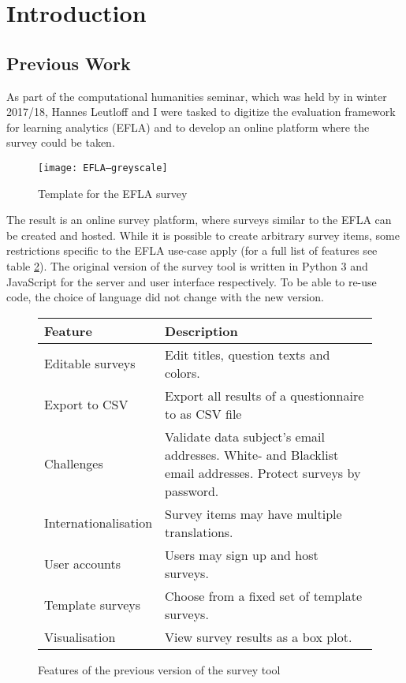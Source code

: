 \section{Introduction}


\subsection{Previous Work}
    As part of the computational humanities seminar, which was held by \profhd in winter 2017/18, Hannes Leutloff
    and I were tasked to digitize the evaluation framework for learning analytics (EFLA) \cite{efla} and to
    develop an online platform where the survey could be taken.

    \begin{figure}
        \centering
        \texttt{[image: EFLA--greyscale]}
        \caption{Template for the EFLA survey \cite{efla-website}}
        \label{fig:efla-template}
    \end{figure}

   The result is an online survey platform, where surveys similar to the EFLA can be created
   and hosted. While it is possible to create arbitrary survey items, some restrictions
   specific to the EFLA use-case apply (for a full list of features see table \ref{table:v1-features}).
   The original version of the survey tool is written in Python 3 and JavaScript for the server
   and user interface respectively. To be able to re-use code, the choice of language did not
   change with the new version.
   

   \begin{figure}
       \begin{tabularx}{\textwidth}{|l|X|}
            \hline
            Feature & Description \\
            \hline \hline
            Editable surveys & Edit titles, question texts and colors.\\
            Export to CSV & Export all results of a questionnaire to as CSV file\\
            Challenges & Validate data subject's email addresses. 
            White- and Blacklist email addresses. Protect surveys by password.\\
            Internationalisation & Survey items may have multiple translations.\\
            User accounts & Users may sign up and host surveys.\\
            Template surveys & Choose from a fixed set of template surveys.\\
            Visualisation & View survey results as a box plot.\\
            \hline
       \end{tabularx}
       \caption{Features of the previous version of the survey tool}
       \label{table:v1-features}
   \end{figure}

